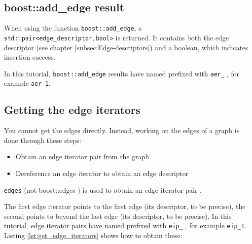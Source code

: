 \subsection{boost::add_edge result}
\label{subsec:boost::add_edge result}

When using the function \verb;boost::add_edge;, 
a \verb;std::pair<edge_descriptor,bool>; is returned.
It contains both the edge descriptor 
(see chapter \ref{subsec:Edge-descriptors}) 
and a boolean, which indicates insertion success.

In this tutorial, \verb;boost::add_edge; results 
have named prefixed with \verb;aer_; , 
for example \verb;aer_1;.

\subsection{Getting the edge iterators}
\label{subsec:get_edge_iterators}

You cannot get the edges directly.
Instead, working on the edges of a graph is done through these steps:

\begin{itemize}
  \item Obtain an edge iterator pair from the graph
  \item Dereference an edge iterator to obtain an edge descriptor
\end{itemize}

\verb;edges;  
(not boost::edges )
is used to obtain an edge iterator pair
.

The first edge iterator 
points to the first edge (its descriptor, to be precise), the second points
to beyond the last edge (its descriptor, to be precise).
In this tutorial, 
edge iterator pairs have named prefixed with \verb;eip_; , 
for example \verb;eip_1;.
Listing \ref{lst:get_edge_iterators}
shows how to obtain these:



